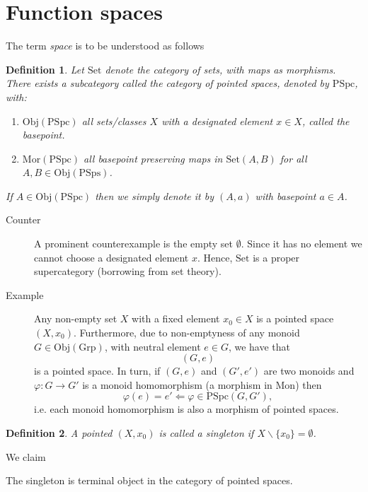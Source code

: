 \documentclass[10pt,a4paper]{article}
\newtheorem{defi}{Definition}
\begin{document}
\section{Function spaces}
The term \textit{space} is to be understood as follows
\begin{defi}
Let $\mathrm{Set}$ denote the category of sets, with maps as morphisms. There exists a subcategory called the category of pointed spaces, denoted by $\mathrm{PSpc}$, with:
\begin{enumerate}
\item $\mathrm{Obj}(\mathrm{PSpc})$ all sets/classes $X$ with a designated element $x \in X$, called the basepoint.
\item $\mathrm{Mor}(\mathrm{PSpc})$ all basepoint preserving maps in $\mathrm{Set}(A,B)$ for all $A, B \in \mathrm{Obj}(\mathrm{PSps})$.
\end{enumerate}
If $A \in \mathrm{Obj}(\mathrm{PSpc})$ then we simply denote it by $(A, a)$ with basepoint $a \in A$.
\end{defi}
\begin{description}
\item[Counter] A prominent counterexample is the empty set $\emptyset$. Since it has no element we cannot choose a designated element $x$. Hence, $\mathrm{Set}$ is a proper supercategory (borrowing from set theory).
\item[Example] Any non-empty set $X$ with a fixed element $x_0 \in X$ is a pointed space $(X,x_0)$. Furthermore, due to non-emptyness of any monoid $G \in \mathrm{Obj}(\mathrm{Grp})$, with neutral element $e \in G$, we have that
$$(G, e)$$ is a pointed space. In turn, if $(G, e)$ and $(G', e')$ are two monoids and $\varphi : G \longrightarrow G'$ is a monoid homomorphism (a morphism in $\mathrm{Mon}$) then
$$\varphi(e) = e' \Leftarrow \varphi \in \mathrm{PSpc}(G,G'),$$
i.e. each monoid homomorphism is also a morphism of pointed spaces.
\end{description}
\begin{defi}
A pointed $(X,x_0)$ is called a \textit{singleton} if $X\backslash\{x_0\} = \emptyset$.
\end{defi}
We claim
\begin{prop}
The singleton is terminal object in the category of pointed spaces.
\end{prop}
\end{document}

